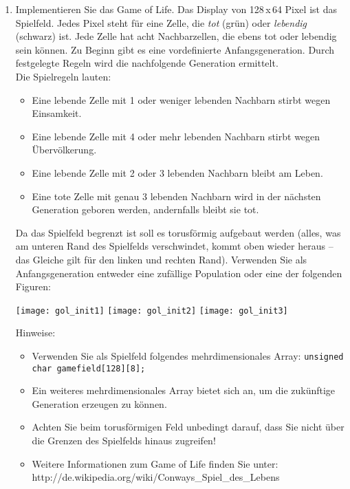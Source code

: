 \documentclass[
  accentcolor=tud1c,	%
  colorbacktitle,		%
  inverttitle,			%
  german,				%
  twoside
]{tudexercise}
\begin{document}
\begin{enumerate}
\item Implementieren Sie das \glqq{}Game of Life\grqq{}. Das Display von 128\,x\,64 Pixel ist das Spielfeld. Jedes Pixel steht für eine Zelle, die \textit{tot} (grün) oder \textit{lebendig} (schwarz) ist. Jede Zelle hat acht Nachbarzellen, die ebens tot oder lebendig sein können. Zu Beginn gibt es eine vordefinierte Anfangsgeneration. Durch festgelegte Regeln wird die nachfolgende Generation ermittelt.\\
Die Spielregeln lauten:
\begin{itemize}
\item Eine lebende Zelle mit 1 oder weniger lebenden Nachbarn stirbt wegen Einsamkeit.
\item Eine lebende Zelle mit 4 oder mehr lebenden Nachbarn stirbt wegen Übervölkerung.
\item Eine lebende Zelle mit 2 oder 3 lebenden Nachbarn bleibt am Leben.
\item Eine tote Zelle mit genau 3 lebenden Nachbarn wird in der nächsten Generation geboren werden, andernfalls bleibt sie tot.
\end{itemize}
Da das Spielfeld begrenzt ist soll es torusförmig aufgebaut werden (alles, was am unteren Rand des Spielfelds verschwindet, kommt oben wieder heraus -- das Gleiche gilt für den linken und rechten Rand). Verwenden Sie als Anfangsgeneration entweder eine zufällige Population oder eine der folgenden Figuren:
\begin{center}
\texttt{[image: gol\_init1]}
\hspace{5mm}
\texttt{[image: gol\_init2]}
\hspace{5mm}
\texttt{[image: gol\_init3]}
\end{center}
Hinweise:
\begin{itemize}
\item Verwenden Sie als Spielfeld folgendes mehrdimensionales Array:
\texttt{unsigned char gamefield[128][8];}
\item Ein weiteres mehrdimensionales Array bietet sich an, um die zukünftige Generation erzeugen zu können.
\item Achten Sie beim torusförmigen Feld unbedingt darauf, dass Sie nicht über die Grenzen des Spielfelds hinaus zugreifen!
\item Weitere Informationen zum Game of Life finden Sie unter:\\
http://de.wikipedia.org/wiki/Conways\_Spiel\_des\_Lebens
\end{itemize}

\end{enumerate}
\end{document}
